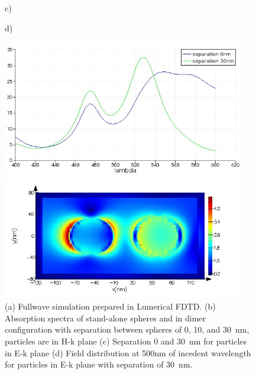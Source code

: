 \documentclass[a4paper]{article}
\begin{document}
\begin{figure}
\begin{minipage}[h]{0.49\textwidth}
  \end{minipage}
  \begin{minipage}[h]{0.49\textwidth}    \begin{flushleft}     c)    \end{flushleft}
  \end{minipage}
  \begin{minipage}[h]{0.49\textwidth}    \begin{flushleft}     d)   \end{flushleft}
  \end{minipage}
  \begin{minipage}[h]{0.49\textwidth} 
    \includegraphics[width=0.95\textwidth]{fdtd-spectra-Ek}
  \end{minipage}
  \begin{minipage}[h]{0.49\textwidth} 
    \includegraphics[width=0.95\textwidth]{fdtd-field}
  \end{minipage}
    \caption{(a) Fullwave simulation prepared in Lumerical FDTD. (b)
     Absorption spectra of stand-alone spheres and in dimer
     configuration with separation between spheres of 0, 10, and
     30~nm, particles are in H-k plane (c) Separation 0 and 30~nm for
     particles in E-k plane (d) Field distribution at 500nm of
     incedent wavelength for particles in E-k plane with separation of
     30~nm.\label{fig:fdtd}}%
\end{figure}
\end{document}
